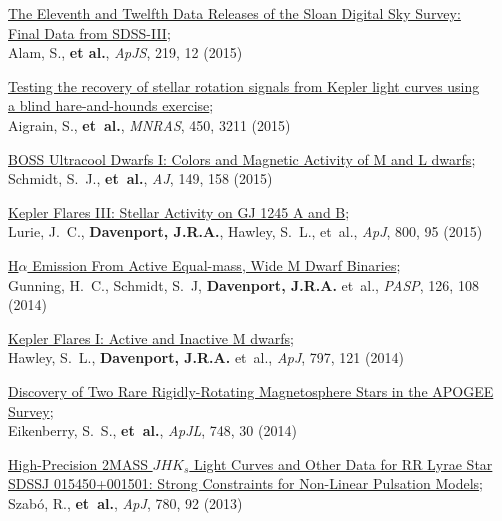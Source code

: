 \documentclass{article}
\begin{document}
\begin{llist}
\begin{etaremune}[leftmargin=10pt]
\item{\sc \href{http://adsabs.harvard.edu/abs/2015arXiv150100963A}{\color{blue}The Eleventh and Twelfth Data Releases of the Sloan Digital Sky Survey: \\ Final Data from SDSS-III}}; \\
Alam, S., {\bf et al.}, {\em ApJS}, 219, 12 (2015)

\item{\sc \href{http://adsabs.harvard.edu/abs/2015MNRAS.450.3211A}{\color{blue}Testing the recovery of stellar rotation signals from Kepler light curves using\\ a blind hare-and-hounds exercise}};\\
Aigrain, S., {\bf et~al.}, {\em MNRAS}, 450, 3211 (2015)

\item{\sc \href{http://adsabs.harvard.edu/abs/2015AJ....149..158S}{\color{blue}BOSS Ultracool Dwarfs I: Colors and Magnetic Activity of M and L dwarfs}};\\
Schmidt, S.~J., {\bf et~al.}, {\em AJ}, 149, 158 (2015)

\item{\sc \href{http://adsabs.harvard.edu/abs/2015ApJ...800...95L}{\color{blue}Kepler Flares III: Stellar Activity on GJ 1245 A and B}};\\
Lurie, J.~C., {\bf Davenport, J.R.A.}, Hawley, S.~L., et~al., {\em ApJ}, 800, 95 (2015)

\item{\sc \href{http://adsabs.harvard.edu/abs/2014PASP..126.1081G}{\color{blue}H$\alpha$ Emission From Active Equal-mass, Wide M Dwarf Binaries}};\\
Gunning, H.~C., Schmidt, S.~J, {\bf Davenport, J.R.A.} et~al., {\em PASP}, 126, 108 (2014)

\item{\sc \href{http://arxiv.org/abs/1410.7779}{\color{blue}Kepler Flares I: Active and Inactive M dwarfs}};\\
Hawley, S.~L., {\bf Davenport, J.R.A.} et~al., {\em ApJ}, 797, 121 (2014)

\item {\sc \href{http://adsabs.harvard.edu/abs/2014ApJ...784L..30E}{\color{blue}Discovery of Two Rare Rigidly-Rotating Magnetosphere Stars in the APOGEE Survey}};\\
Eikenberry, S.~S., {\bf et~al.}, {\em ApJL}, 748, 30 (2014)

\item {\sc \href{http://adsabs.harvard.edu/abs/2014ApJ...780...92S}{\color{blue}High-Precision 2MASS $JHK_s$ Light Curves and Other Data for RR Lyrae Star SDSSJ 015450+001501: Strong Constraints for Non-Linear Pulsation Models}};\\
Szab\'{o}, R., {\bf et~al.}, {\em ApJ}, 780, 92 (2013)


\end{etaremune}
\end{llist}
\end{document}
